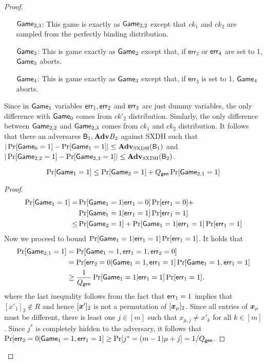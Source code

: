 \begin{proof}
\begin{itemize}
\item[$\mathsf{Game}_{2,3}$:] This game is exactly as $\mathsf{Game}_{2,2}$ except that $ck_1$ and $ck_2$ are sampled from the perfectly binding distribution.
\item[$\mathsf{Game}_3$:] This is game exactly as $\mathsf{Game}_2$ except that, if $\mathsf{err}_3$ or $\mathsf{err}_4$ are set to 1, $\mathsf{Game}_3$ aborts.
\item[$\mathsf{Game}_4$:] This is game exactly as $\mathsf{Game}_3$ except that, if $\mathsf{err}_3$ is set to 1, $\mathsf{Game}_4$ aborts. 
\end{itemize}
Since in $\mathsf{Game}_1$ variables $\mathsf{err}_1,\mathsf{err}_2$ and $\mathsf{err}_3$ are just dummy variables, the only difference with $\mathsf{Game}_0$ comes from $ck'_2$ distribution. Simlarly, the only difference between $\mathsf{Game}_{2,2}$ and $\mathsf{Game}_{2,3}$ comes from $ck_1$ and $ck_2$ distribution.
It follows that there an adversares $\mathsf{B}_{1},\mathbf{Adv}{B}_{2}$ against SXDH such that $|\Pr[\mathsf{Game}_0=1]-\Pr[\mathsf{Game}_1=1]|\leq \mathbf{Adv}_{\mathrm{SXDH}}(\mathsf{B}_{1})$ and $|\Pr[\mathsf{Game}_{2,2}=1]-\Pr[\mathsf{Game}_{2,3}=1]|\leq \mathbf{Adv}_{\mathrm{SXDH}}(\mathsf{B}_{2})$.

\begin{lemma} 
$$
\Pr[\mathsf{Game}_1=1]\leq \Pr[\mathsf{Game}_2=1] + Q_\mathsf{gen}\Pr[\mathsf{Game}_{2,1}=1]
$$
\end{lemma}
\begin{proof}
\begin{align*}
\Pr[\mathsf{Game}_1=1]
 = &\Pr[\mathsf{Game}_1=1|\mathsf{err}_1=0]\Pr[\mathsf{err}_1=0]+\\
&\Pr[\mathsf{Game}_1=1|\mathsf{err}_1=1]\Pr[\mathsf{err}_1=1]\\
 \leq& \Pr[\mathsf{Game}_2=1] + \Pr[\mathsf{Game}_1=1|\mathsf{err}_1=1]\Pr[\mathsf{err}_1=1]\\
\end{align*}
Now we proceed to bound $\Pr[\mathsf{Game}_1=1|\mathsf{err}_1=1]\Pr[\mathsf{err}_1=1]$. It holds that
\begin{align*}
\Pr[\mathsf{Game}_{2,1}=1] 
&= \Pr[\mathsf{Game}_1=1,\mathsf{err}_1=1,\mathsf{err}_2=0]\\
&= \Pr[\mathsf{err}_2=0|\mathsf{Game}_1=1,\mathsf{err}_1=1]\Pr[\mathsf{Game}_1 = 1,\mathsf{err}_1=1]\\
&\geq \frac{1}{Q_\mathsf{gen}}\Pr[\mathsf{Game}_1=1|\mathsf{err}_1=1]\Pr[\mathsf{err}_1=1].
\end{align*}
where the last inequality follows from the fact that $\mathsf{err}_1=1$ implies that $[x'_1]_2\notin R$ and hence $[{\boldsymbol{x}}']_2$ is not a permutation of $[{\boldsymbol{x}}_\mu]_2$. Since all entries of ${\boldsymbol{x}}_\mu$ must be different, there is least one $j\in[m]$ such that $x_{\mu,j}\neq x'_k$ for all $k\in[m]$. Since $j^*$ is completely hidden to the adversary, it follows that $\Pr[\mathsf{err}_2=0|\mathsf{Game}_1=1,\mathsf{err}_1=1] \geq \Pr[j^*=(m-1)\mu+j] = 1/Q_\mathsf{gen}$.
\end{proof}


\end{proof}
